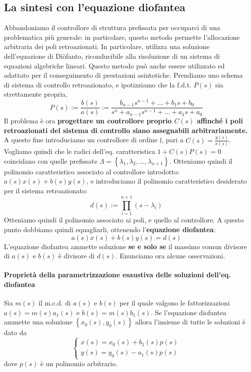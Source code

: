 \documentclass[11pt]{article}
\begin{document}
\subsection{La sintesi con l'equazione diofantea}
Abbandoniamo il controllore di struttura prefissata per occuparci di una problematica più generale: in particolare, questo metodo permette l'allocazione arbitraria dei poli retroazionati. In particolare, utilizza una soluzione dell'equazione di Diòfanto, riconducibile alla risoluzione di un sistema di equazioni algebriche lineari. Questo metodo può anche essere utilizzato ed adattato per il conseguimento di prestazioni asintotiche. Prendiamo uno schema di sistema di controllo retroazionato, e ipotizziamo che la f.d.t. $P(s)$ sia strettamente propria,
\begin{displaymath}
    P(s):=\frac{b(s)}{a(s)} :=\frac{b_{n-1}s^{n-1}+...+b_1s+b_0}{s^n+a_{n-1}s^{n-1}+...+a_1s+a_0}
\end{displaymath}
Il problema è ora \textbf{progettare un controllore proprio $C(s)$ affinché i poli retroazionati del sistema di controllo siano assegnabili arbitrariamente.}
A questo fine introduciamo un controllore di ordine $l$, pari a $C(s)=\frac{y(s)}{x(s)}$. Vogliamo quindi che le radici dell'eq. caratteristica $1+C(s)P(s)=0$ coincidano con quelle prefissate $\Lambda = \left\{\lambda_1, \lambda_2,...,\lambda_{n+1} \right\}$. Otteniamo quindi il polinomio caratteristico associato al controllore introdotto: $a(s)x(s)+b(s)y(s)$, e introduciamo il polinomio caratteristico desiderato per il sistema retroazionato:
\begin{displaymath}
    d(s) := \prod_{i=1}^{n+1} (s-\lambda_i)
\end{displaymath}
Otteniamo quindi il polinomio associato ai poli, e quello al controllore. A questo punto dobbiamo quindi equagliarli, ottenendo l'\textbf{equazione diofantea}:
\begin{displaymath}
    a(s)x(s)+b(s)y(s)=d(s)
\end{displaymath}
L'equazione diofantea ammette soluzione \textbf{se e solo se} il massimo comun divisore di $a(s)$ e $b(s)$ è divisore di $d(s)$. Enunciamo ora alcune osservazioni.
\paragraph{Proprietà della parametrizzazione esaustiva delle soluzioni dell'eq. diofantea} Sia $m(s)$ il m.c.d. di $a(s)$ e $b(s)$ per il quale valgono le fattorizzazioni $a(s)=m(s)a_1(s)$ e $b(s)=m(s)b_1(s)$. Se l'equazione diofantea ammette una soluzione $\left\{x_0(s), y_0(s)\right\}$ allora l'insieme di tutte le soluzioni è dato da
\begin{displaymath}
    \begin{cases}
        x(s) = x_0(s)+b_1(s)p(s) \\
        y(s) = y_0(s)-a_1(s)p(s)
    \end{cases}
\end{displaymath}
dove $p(s)$ è un polinomio arbitrario.
\end{document}
